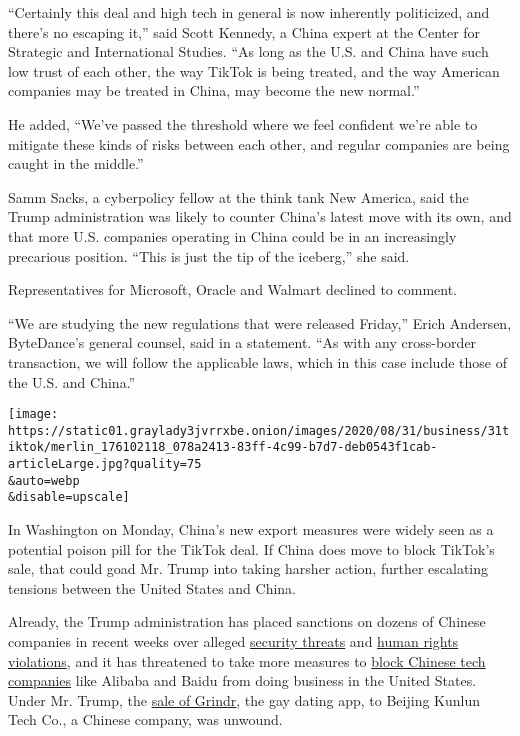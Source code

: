 ``Certainly this deal and high tech in general is now inherently
politicized, and there's no escaping it,'' said Scott Kennedy, a China
expert at the Center for Strategic and International Studies. ``As long
as the U.S. and China have such low trust of each other, the way TikTok
is being treated, and the way American companies may be treated in
China, may become the new normal.''

He added, ``We've passed the threshold where we feel confident we're
able to mitigate these kinds of risks between each other, and regular
companies are being caught in the middle.''

Samm Sacks, a cyberpolicy fellow at the think tank New America, said the
Trump administration was likely to counter China's latest move with its
own, and that more U.S. companies operating in China could be in an
increasingly precarious position. ``This is just the tip of the
iceberg,'' she said.

Representatives for Microsoft, Oracle and Walmart declined to comment.

``We are studying the new regulations that were released Friday,'' Erich
Andersen, ByteDance's general counsel, said in a statement. ``As with
any cross-border transaction, we will follow the applicable laws, which
in this case include those of the U.S. and China.''

\texttt{[image: https://static01.graylady3jvrrxbe.onion/images/2020/08/31/business/31tiktok/merlin\_176102118\_078a2413-83ff-4c99-b7d7-deb0543f1cab-articleLarge.jpg?quality=75\\\&auto=webp\\\&disable=upscale]}

In Washington on Monday, China's new export measures were widely seen as
a potential poison pill for the TikTok deal. If China does move to block
TikTok's sale, that could goad Mr. Trump into taking harsher action,
further escalating tensions between the United States and China.

Already, the Trump administration has placed sanctions on dozens of
Chinese companies in recent weeks over alleged
\href{https://www.nytimes3xbfgragh.onion/2020/08/26/business/economy/trump-sanctions-south-china-sea.html}{security
threats} and
\href{https://www.nytimes3xbfgragh.onion/2019/10/07/us/politics/us-to-blacklist-28-chinese-entities-over-abuses-in-xinjiang.html}{human
rights violations}, and it has threatened to take more measures to
\href{https://www.state.gov/announcing-the-expansion-of-the-clean-network-to-safeguard-americas-assets/}{block
Chinese tech companies} like Alibaba and Baidu from doing business in
the United States. Under Mr. Trump, the
\href{https://www.nytimes3xbfgragh.onion/2019/03/28/us/politics/grindr-china-national-security.html}{sale
of Grindr}, the gay dating app, to Beijing Kunlun Tech Co., a Chinese
company, was unwound.

